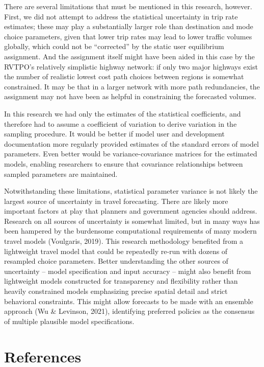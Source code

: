 \documentclass[fancy, masters,twoside]{byuthesis}
\begin{document}
There are several limitations that must be mentioned in this research, however. First, we did not attempt to address the statistical uncertainty in trip rate estimates; these may play a substantially larger role than destination and mode choice parameters, given that lower trip rates may lead to lower traffic volumes globally, which could not be ``corrected'' by the static user equilibrium assignment. And the assignment itself might have been aided in this case by the RVTPO's relatively simplistic highway network: if only two major highways exist the number of realistic lowest cost path choices between regions is somewhat constrained. It may be that in a larger network with more path redundancies, the assignment may not have been as helpful in constraining the forecasted volumes.

In this research we had only the estimates of the statistical coefficients, and therefore had to assume a coefficient of variation to derive variation in the sampling procedure. It would be better if model user and development documentation more regularly provided estimates of the standard errors of model parameters. Even better would be variance-covariance matrices for the estimated models, enabling researchers to ensure that covariance relationships between sampled parameters are maintained.

Notwithstanding these limitations, statistical parameter variance is not likely the largest source of uncertainty in travel forecasting. There are likely more important factors at play that planners and government agencies should address. Research on all sources of uncertainty is somewhat limited, but in many ways has been hampered by the burdensome computational requirements of many modern travel models (Voulgaris, 2019). This research methodology benefited from a lightweight travel model that could be repeatedly re-run with dozens of resampled choice parameters. Better understanding the other sources of uncertainty -- model specification and input accuracy -- might also benefit from lightweight models constructed for transparency and flexibility rather than heavily constrained models emphasizing precise spatial detail and strict behavioral constraints. This might allow forecasts to be made with an ensemble approach (Wu \& Levinson, 2021), identifying preferred policies as the consensus of multiple plausible model specifications.

\hypertarget{references}{%
\chapter*{References}\label{references}}
\end{document}
